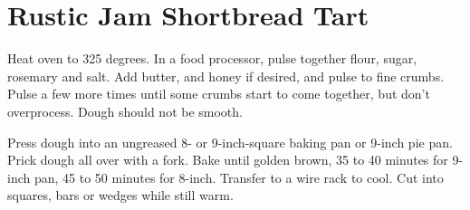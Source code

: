 \section{Rustic Jam Shortbread Tart}
\begin{recipe}



	Heat oven to 325 degrees. In a food processor, pulse together flour, sugar, rosemary and salt. Add butter, and honey if desired, and pulse to fine crumbs. Pulse a few more times until some crumbs start to come together, but don't overprocess. Dough should not be smooth.

	Press dough into an ungreased 8- or 9-inch-square baking pan or 9-inch pie pan. Prick dough all over with a fork. Bake until golden brown, 35 to 40 minutes for 9-inch pan, 45 to 50 minutes for 8-inch. Transfer to a wire rack to cool. Cut into squares, bars or wedges while still warm.
\end{recipe}
